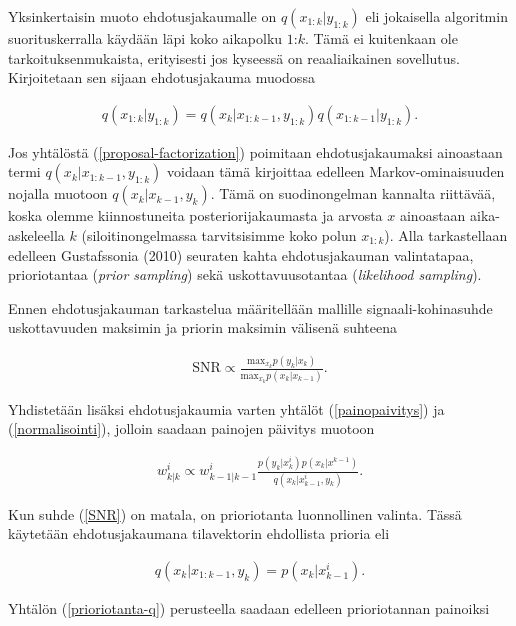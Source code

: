 \documentclass[
  12pt,
  a4paper, twoside]{book}
\begin{document}
Yksinkertaisin muoto ehdotusjakaumalle on \(q(x_{1:k}|y_{1:k})\) eli jokaisella algoritmin suorituskerralla käydään läpi koko aikapolku \(1\):\(k\). Tämä ei kuitenkaan ole tarkoituksenmukaista, erityisesti jos kyseessä on reaaliaikainen sovellutus. Kirjoitetaan sen sijaan ehdotusjakauma muodossa

\begin{align}\label{proposal-factorization}
q(x_{1:k}|y_{1:k})=q(x_k|x_{1:k-1},y_{1:k})q(x_{1:k-1}|y_{1:k}).
\end{align}

Jos yhtälöstä (\ref{proposal-factorization}) poimitaan ehdotusjakaumaksi ainoastaan termi \(q(x_k|x_{1:k-1},y_{1:k})\) voidaan tämä kirjoittaa edelleen Markov-ominaisuuden nojalla muotoon \(q(x_k|x_{k-1},y_{k})\). Tämä on suodinongelman kannalta riittävää, koska olemme kiinnostuneita posteriorijakaumasta ja arvosta \(x\) ainoastaan aika-askeleella \(k\) (siloitinongelmassa tarvitsisimme koko polun \(x_{1:k}\)). Alla tarkastellaan edelleen Gustafssonia (2010) \citep{gustafsson-2010} seuraten kahta ehdotusjakauman valintatapaa, prioriotantaa (\emph{prior sampling}) sekä uskottavuusotantaa (\emph{likelihood sampling}).

Ennen ehdotusjakauman tarkastelua määritellään mallille signaali-kohinasuhde uskottavuuden maksimin ja priorin maksimin välisenä suhteena

\begin{align}\label{SNR}
\text{SNR}\propto \frac{\text{max}_{x_k}p(y_k|x_k)}{\text{max}_{x_k}p(x_k|x_{k-1})}. 
\end{align}

\noindent Yhdistetään lisäksi ehdotusjakaumia varten yhtälöt (\ref{painopaivitys}) ja (\ref{normalisointi}), jolloin saadaan painojen päivitys muotoon

\begin{align}\label{painopaivitys-propto}
w^i_{k|k} \propto w^i_{k-1|k-1}\frac{p(y_k|x^i_k)p(x_k|x^{k-1})}{q(x_k|x^i_{k-1},y_k)}.
\end{align}

Kun suhde (\ref{SNR}) on matala, on prioriotanta luonnollinen valinta. Tässä käytetään ehdotusjakaumana tilavektorin ehdollista prioria eli

\begin{align}\label{prioriotanta-q}
q(x_k|x_{1:k-1},y_{k})=p(x_k|x^i_{k-1}).
\end{align}

\noindent Yhtälön (\ref{prioriotanta-q}) perusteella saadaan edelleen prioriotannan painoiksi
\end{document}
